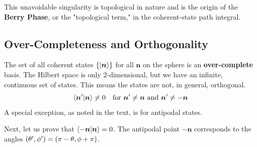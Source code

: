 This unavoidable singularity is topological in nature and is the origin of the \textbf{Berry Phase}, or the "topological term," in the coherent-state path integral.

\subsection{Over-Completeness and Orthogonality}

The set of all coherent states $\{|\bm{n}\rangle\}$ for all $\bm{n}$ on the sphere is an \textbf{over-complete} basis. The Hilbert space is only 2-dimensional, but we have an infinite, continuous set of states. This means the states are not, in general, orthogonal.
\begin{equation}
    \langle\bm{n}'|\bm{n}\rangle \neq 0 \quad \text{for } \bm{n}' \neq \bm{n} \text{ and } \bm{n}' \neq -\bm{n}
\end{equation}
A special exception, as noted in the text, is for antipodal states.

Next, let us prove that $\langle-\bm{n}|\bm{n}\rangle = 0$. The antipodal point $-\bm{n}$ corresponds to the angles $(\theta', \phi') = (\mathrm{\pi} - \theta, \phi + \mathrm{\pi})$.

